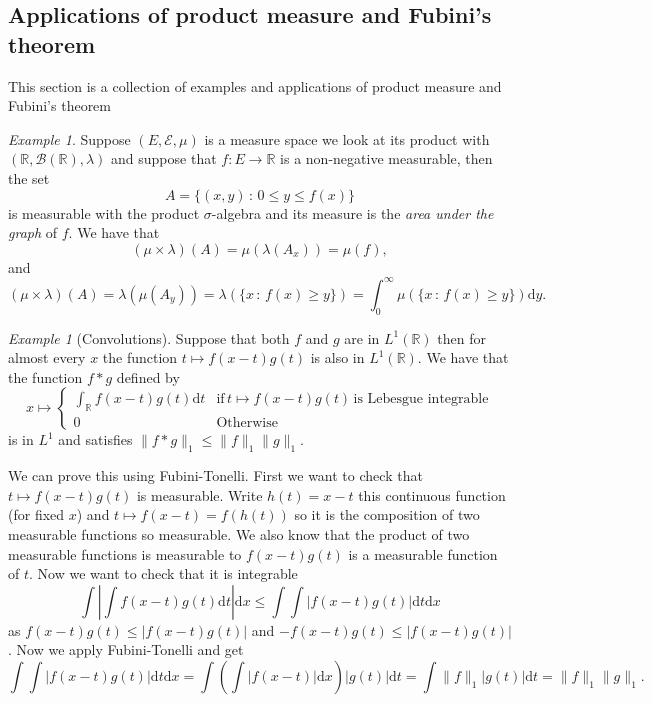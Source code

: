 \documentclass[11pt]{article}
\theoremstyle{definition}
\theoremstyle{remark}
\newtheorem{ex}[thm]{Example}
\begin{document}
\subsection{Applications of product measure and Fubini's theorem}
This section is a collection of examples and applications of product measure and Fubini's theorem

\begin{ex}
Suppose $(E, \mathcal{E}, \mu)$ is a measure space we look at its product with $(\mathbb{R}, \mathcal{B}(\mathbb{R}), \lambda)$ and suppose that $f:E \rightarrow \mathbb{R}$ is a non-negative measurable, then the set
\[ A = \{(x,y) \,:\, 0 \leq y \leq f(x) \} \] is measurable with the product $\sigma$-algebra and its measure is the \emph{area under the graph} of $f$. We have that 
\[ (\mu \times \lambda)(A) = \mu( \lambda(A_x)) = \mu(f),  \] and
\[ (\mu \times \lambda)(A) = \lambda( \mu(A_y)) = \lambda (\{ x \,:\, f(x) \geq y \}) = \int_0^ \infty \mu(\{x \,:\, f(x) \geq y\}) \mathrm{d}y. \]
\end{ex}



\begin{ex}[Convolutions]
Suppose that both $f$ and $g$ are in $L^1(\mathbb{R})$ then for almost every $x$ the function $ t \mapsto f(x-t) g(t)$ is also in $L^1(\mathbb{R})$. We have that the function $f*g$ defined by
\[ x \mapsto \left\{ \begin{array}{ll} \int_\mathbb{R} f(x-t)g(t) \mathrm{d}t & \mbox{if}\, t \mapsto f(x-t)g(t)\, \mbox{is Lebesgue integrable} \\
0 & \mbox{Otherwise} \end{array}\right. \] is in $L^1$ and satisfies $\|f*g\|_1 \leq \|f\|_1 \|g\|_1$.

We can prove this using Fubini-Tonelli. First we want to check that $t \mapsto f(x-t)g(t)$ is measurable. Write $h(t) = x-t$ this continuous function (for fixed $x$) and $t \mapsto f(x-t) = f(h(t))$ so it is the composition of two measurable functions so measurable. We also know that the product of two measurable functions is measurable to $f(x-t)g(t)$ is a measurable function of $t$. Now we want to check that it is integrable
\[ \int \left| \int f(x-t)g(t) \mathrm{d}t \right| \mathrm{d}x \leq \int \int |f(x-t)g(t)| \mathrm{d}t \mathrm{d}x \] as $f(x-t)g(t) \leq |f(x-t)g(t)|$ and $-f(x-t)g(t) \leq |f(x-t)g(t)|$. Now we apply Fubini-Tonelli and get
\[ \int \int |f(x-t)g(t)| \mathrm{d}t \mathrm{d}x = \int \left( \int |f(x-t)| \mathrm{d}x\right) |g(t)| \mathrm{d}t = \int \|f\|_1 |g(t)| \mathrm{d}t = \|f\|_1 \|g\|_1. \]
\end{ex}
\end{document}
